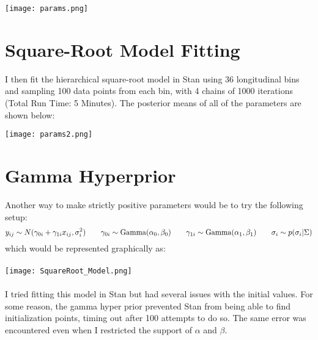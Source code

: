 \documentclass[12pt]{article}
\begin{document}
\indent\indent \texttt{[image: params.png]}

\pagebreak
\section*{Square-Root Model Fitting}
I then fit the hierarchical square-root model in Stan using 36 longitudinal bins and sampling 100 data points from each bin, with 4 chains of 1000 iterations (Total Run Time: 5 Minutes).  The posterior means of all of the parameters are shown below:

\indent\indent \texttt{[image: params2.png]}

\pagebreak
\section*{Gamma Hyperprior}
Another way to make strictly positive parameters would be to try the following setup:
$$y_{ij} \sim N( \gamma_{0i} + \gamma_{1i}x_{ij}, \sigma_i^2)
\hspace{20 pt} \gamma_{0i} \sim \text{Gamma}(\alpha_0,\beta_0)
\hspace{20 pt} \gamma_{1i} \sim \text{Gamma}(\alpha_1,\beta_1)
\hspace{20 pt} \sigma_i \sim p(\sigma_i|\Sigma)$$
which would be represented graphically as:\\ \\
\indent\indent\indent\indent\indent\indent\indent\indent \texttt{[image: SquareRoot\_Model.png]}\\ \\
I tried fitting this model in Stan but had several issues with the initial values. For some reason, the gamma hyper prior prevented Stan from being able to find initialization points, timing out after 100 attempts to do so. The same error was encountered even when I restricted the support of $\alpha$ and $\beta$.

\end{document}
